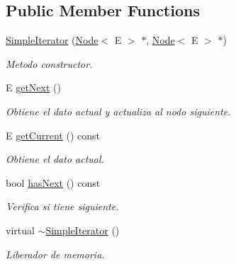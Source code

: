 \subsection*{Public Member Functions}
\begin{DoxyCompactItemize}
\item 
\hyperlink{class_simple_iterator_a643cab8769a566826092a5db6ace3267}{Simple\-Iterator} (\hyperlink{class_node}{Node}$<$ E $>$ $\ast$, \hyperlink{class_node}{Node}$<$ E $>$ $\ast$)
\begin{DoxyCompactList}\small\item\em Metodo constructor. \end{DoxyCompactList}\item 
E \hyperlink{class_simple_iterator_ab01032dba9ff4f1a1c47af3082b717d5}{get\-Next} ()
\begin{DoxyCompactList}\small\item\em Obtiene el dato actual y actualiza al nodo siguiente. \end{DoxyCompactList}\item 
E \hyperlink{class_simple_iterator_ac9460c98985a20f781f351c85b8a3ba2}{get\-Current} () const 
\begin{DoxyCompactList}\small\item\em Obtiene el dato actual. \end{DoxyCompactList}\item 
bool \hyperlink{class_simple_iterator_ab946b3d707e32d4d53f15af201ea2113}{has\-Next} () const 
\begin{DoxyCompactList}\small\item\em Verifica si tiene siguiente. \end{DoxyCompactList}\item 
\hypertarget{class_simple_iterator_a02203109d263581340152408ebb120a2}{virtual \hyperlink{class_simple_iterator_a02203109d263581340152408ebb120a2}{$\sim$\-Simple\-Iterator} ()}\label{class_simple_iterator_a02203109d263581340152408ebb120a2}

\begin{DoxyCompactList}\small\item\em Liberador de memoria. \end{DoxyCompactList}\end{DoxyCompactItemize}
